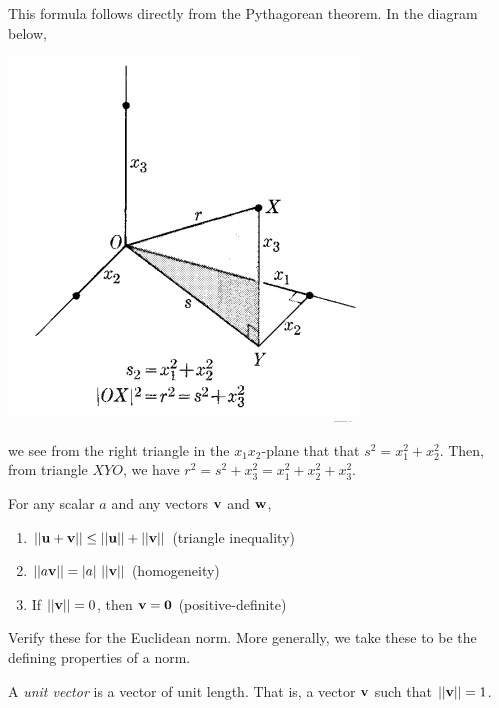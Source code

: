 \documentclass[12pt,letterpaper,reqno]{article}
\numberwithin{equation}{section}
\newcommand{\ti}[1]{\textit{#1}}
\begin{document}
\begin{pf}
This formula follows directly from the Pythagorean theorem. In the diagram below,
\begin{center}
	\includegraphics[scale=0.5]{figures_mvc/euclidean_norm}
\end{center}	
we see from the right triangle in the $x_1x_2$-plane that that $s^2=x_1^2+x_2^2$. Then, from triangle $XYO$, we have $r^2=s^2+x_3^2=x_1^2+x_2^2+x_3^2$.
\end{pf}

\begin{prop}
	For any scalar $a$ and any vectors ${\bf v}$ and ${\bf w}$,
	\begin{enumerate}[(1)]
		\item $||{\bf u}+{\bf v}||\leq ||{\bf u}|| + ||{\bf v}||$ (triangle inequality)
		\item $||a{\bf v}||=|a| \ ||{\bf v}||$ (homogeneity)
		\item If $||{\bf v}||=0$, then ${\bf v}={\bf 0}$ (positive-definite)
	\end{enumerate}
\end{prop}

\begin{pf}
Verify these for the Euclidean norm. More generally, we take these to be the defining properties of a norm.
\end{pf}

\begin{defn}
	A \ti{unit vector} is a vector of unit length. That is, a vector ${\bf v}$ such that $||{\bf v}||=1$.
\end{defn}
\end{document}
